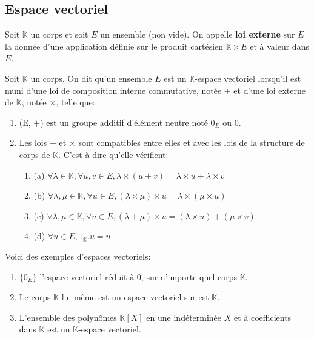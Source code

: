 \subsection{Espace vectoriel}
\begin{madefinition}
	Soit $\mathbb{K}$ un corps et soit $E$ un ensemble (non vide). On appelle \textbf{loi externe} sur $E$ la donnée d'une application définie sur le produit cartésien $\mathbb{K} \times E$ et à valeur dans $E$.
\end{madefinition}
\begin{madefinition}
	Soit $\mathbb{K}$ un corps. On dit qu’un ensemble $E$ est un $\mathbb{K}$-espace vectoriel lorsqu’il est muni d’une loi de composition interne commutative, notée + et d’une loi externe de $\mathbb{K}$, notée $\times$, telle que:
	\begin{enumerate}
		\item (E, $+$) est un groupe additif d'élément neutre noté $0_E$ ou $0$.
		\item Les lois $+$ et $\times$ sont compatibles entre elles et avec les lois de la structure de corps de $\mathbb{K}$. C'est-à-dire qu'elle vérifient:
		\begin{enumerate}
			\item (a) $\forall \lambda \in \mathbb{K}, \forall u,v \in E, \lambda \times (u+v) = \lambda \times u + \lambda \times v$
			\item (b) $\forall \lambda , \mu \in \mathbb{K}, \forall u \in E, (\lambda \times \mu)\times u 
			= \lambda \times(\mu \times u) $
			\item (c) $\forall \lambda, \mu \in \mathbb{K}, \forall u \in E, (\lambda + \mu)\times u = (\lambda \times u) + (\mu \times v)$
			\item (d) $\forall u \in E, 1_{\mathbb{K}}.u=u$
		\end{enumerate}
	\end{enumerate}	
\end{madefinition}
\begin{monexemple}
	Voici des exemples d'espaces vectoriels:
	\begin{enumerate}
		\item $\{0_E\}$ l'espace vectoriel réduit à $0$, sur n’importe quel corps $\mathbb{K}$. 
		\item Le corps $\mathbb{K}$ lui-même est un espace vectoriel sur est $\mathbb{K}$.
		\item  L'ensemble des polynômes $\mathbb{K}[X]$ en une indéterminée $X$ et à coefficients dans $\mathbb{K}$ est un $\mathbb{K}$-espace vectoriel.
	\end{enumerate}
\end{monexemple}
